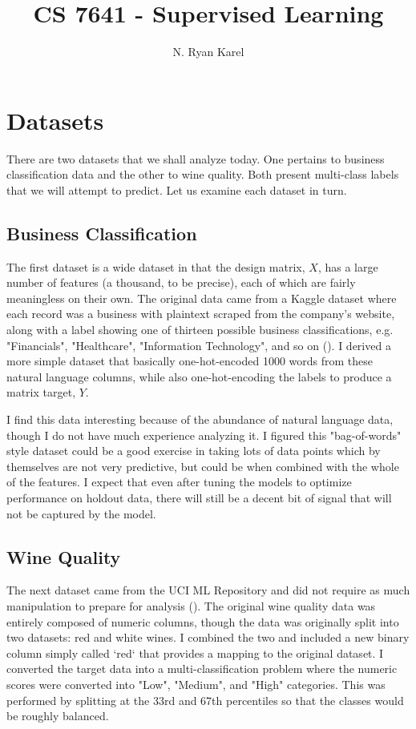 \documentclass[
	letterpaper, %
]{jdf}
\author{N. Ryan Karel}
\title{CS 7641 - Supervised Learning}
\begin{document}

\maketitle

\section{Datasets}
There are two datasets that we shall analyze today. One pertains to business classification data and the other to wine quality. Both present multi-class labels that we will attempt to predict. Let us examine each dataset in turn.

\subsection{Business Classification}
The first dataset is a wide dataset in that the design matrix, $X$, has a large number of features (a thousand, to be precise), each of which are fairly meaningless on their own. The original data came from a Kaggle dataset where each record was a business with plaintext scraped from the company's website, along with a label showing one of thirteen possible business classifications, e.g. "Financials", "Healthcare", "Information Technology", and so on (\cite{kaggle}). I derived a more simple dataset that basically one-hot-encoded 1000 words from these natural language columns, while also one-hot-encoding the labels to produce a matrix target, $Y$. 

I find this data interesting because of the abundance of natural language data, though I do not have much experience analyzing it. I figured this "bag-of-words" style dataset could be a good exercise in taking lots of data points which by themselves are not very predictive, but could be when combined with the whole of the features. I expect that even after tuning the models to optimize performance on holdout data, there will still be a decent bit of signal that will not be captured by the model.

\subsection{Wine Quality}
The next dataset came from the UCI ML Repository and did not require as much manipulation to prepare for analysis (\cite{uci}). The original wine quality data was entirely composed of numeric columns, though the data was originally split into two datasets: red and white wines. I combined the two and included a new binary column simply called `red` that provides a mapping to the original dataset. I converted the target data into a multi-classification problem where the numeric scores were converted into "Low", "Medium", and "High" categories. This was performed by splitting at the 33rd and 67th percentiles so that the classes would be roughly balanced.
\end{document}
